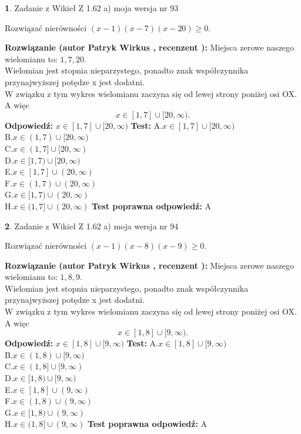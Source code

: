 \documentclass[12pt, a4paper]{article}
\theoremstyle{definition} %
\newtheorem{zad}{}
\newcommand{\zadStart}[1]{\begin{zad}#1\newline}
\newcommand{\zadStop}{\end{zad}}
\newcommand{\rozwStart}[2]{\noindent \textbf{Rozwiązanie (autor #1 , recenzent #2): }\newline}
\newcommand{\rozwStop}{\newline}
\newcommand{\odpStart}{\noindent \textbf{Odpowiedź:}\newline}
\newcommand{\odpStop}{\newline}
\newcommand{\testStart}{\noindent \textbf{Test:}\newline}
\newcommand{\testStop}{\newline}
\newcommand{\kluczStart}{\noindent \textbf{Test poprawna odpowiedź:}\newline}
\newcommand{\kluczStop}{\newline}
\begin{document}
\zadStart{Zadanie z Wikieł Z 1.62 a) moja wersja nr 93}

Rozwiązać nierówności $(x-1)(x-7)(x-20)\ge0$.
\zadStop
\rozwStart{Patryk Wirkus}{}
Miejsca zerowe naszego wielomianu to: $1, 7, 20$.\\
Wielomian jest stopnia nieparzystego, ponadto znak współczynnika przy\linebreak najwyższej potędze x jest dodatni.\\ W związku z tym wykres wielomianu zaczyna się od lewej strony poniżej osi OX. A więc $$x \in [1,7] \cup [20,\infty).$$
\rozwStop
\odpStart
$x \in [1,7] \cup [20,\infty)$
\odpStop
\testStart
A.$x \in [1,7] \cup [20,\infty)$\\
B.$x \in (1,7) \cup [20,\infty)$\\
C.$x \in (1,7] \cup [20,\infty)$\\
D.$x \in [1,7) \cup [20,\infty)$\\
E.$x \in [1,7] \cup (20,\infty)$\\
F.$x \in (1,7) \cup (20,\infty)$\\
G.$x \in [1,7) \cup (20,\infty)$\\
H.$x \in (1,7] \cup (20,\infty)$
\testStop
\kluczStart
A
\kluczStop



\zadStart{Zadanie z Wikieł Z 1.62 a) moja wersja nr 94}

Rozwiązać nierówności $(x-1)(x-8)(x-9)\ge0$.
\zadStop
\rozwStart{Patryk Wirkus}{}
Miejsca zerowe naszego wielomianu to: $1, 8, 9$.\\
Wielomian jest stopnia nieparzystego, ponadto znak współczynnika przy\linebreak najwyższej potędze x jest dodatni.\\ W związku z tym wykres wielomianu zaczyna się od lewej strony poniżej osi OX. A więc $$x \in [1,8] \cup [9,\infty).$$
\rozwStop
\odpStart
$x \in [1,8] \cup [9,\infty)$
\odpStop
\testStart
A.$x \in [1,8] \cup [9,\infty)$\\
B.$x \in (1,8) \cup [9,\infty)$\\
C.$x \in (1,8] \cup [9,\infty)$\\
D.$x \in [1,8) \cup [9,\infty)$\\
E.$x \in [1,8] \cup (9,\infty)$\\
F.$x \in (1,8) \cup (9,\infty)$\\
G.$x \in [1,8) \cup (9,\infty)$\\
H.$x \in (1,8] \cup (9,\infty)$
\testStop
\kluczStart
A
\kluczStop
\end{document}
